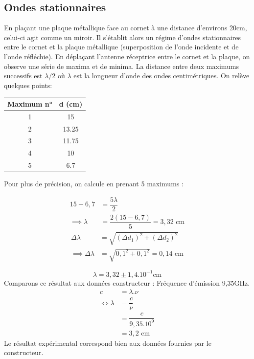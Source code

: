 \documentclass[12pt,a4paper]{article}
\begin{document}
	\subsection{Ondes stationnaires}
	En plaçant une plaque métallique face au cornet à une distance d'environs 20cm, celui-ci agit comme un miroir. Il s'établit alors un régime d'ondes stationnaires entre le cornet et la plaque métallique (superposition de l'onde incidente et de l'onde réfléchie). En déplaçant l'antenne réceptrice entre le cornet et la plaque, on observe une série de maxima et de minima. La distance entre deux maximums successifs est $\lambda$/2 où $\lambda$ est la longueur d'onde des ondes centimétriques. On relève quelques points:
	\begin{center}
		\begin{tabular}{|c|c|}
			\hline 
			Maximum n° & d (cm) \\ 
			\hline 
			1 & 15 \\ 
			\hline 
			2 & 13.25 \\ 
			\hline 
			3 & 11.75 \\ 
			\hline 
			4 & 10 \\ 
			\hline 
			5 & 6.7 \\ 
			\hline 
		\end{tabular} 
	\end{center}
	Pour plus de précision, on calcule en prenant 5 maximums : 
	\setlength\columnseprule{0.5pt}
	\begin{multicols}{2}
		\begin{align*}
		15-6,7 &= \dfrac{5\lambda}{2}\\
		\implies \lambda &= \dfrac{2(15-6,7)}{5}=3,32 \text{ cm}
		\end{align*}
		\vfill
		\columnbreak
		\begin{align*}
		\Delta \lambda &= \sqrt {\left( \Delta d_{1}\right) ^{2}+\left( \Delta d_{2}\right) ^{2}}\\
		\implies \Delta \lambda &= \sqrt {0,1^2+0,1^2}=0,14 \text{ cm}
		\end{align*}
	\end{multicols}
	$$\lambda = 3,32\pm1,4.10^{-1} \text{cm}$$
	Comparons ce résultat aux données constructeur : Fréquence d'émission 9,35GHz.
	\begin{align*}
	c &= \lambda.\nu\\
	\iff \lambda &= \dfrac{c}{\nu}\\
	&=\dfrac{c}{9,35.10^9}\\
	&=3,2 \text{ cm}
	\end{align*}
	Le résultat expérimental correspond bien aux données fournies par le constructeur. 
	
\end{document}
